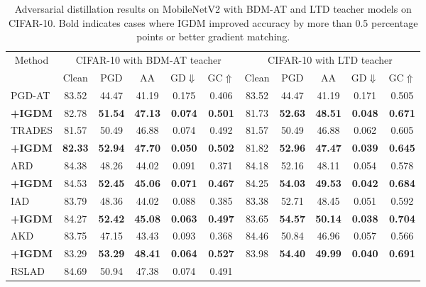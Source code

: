 \documentclass{article} %
\begin{document}
\begin{table}[h]
 \centering
 \caption{Adversarial distillation results on MobileNetV2 with BDM-AT and LTD teacher models on CIFAR-10. Bold indicates cases where IGDM improved accuracy by more than 0.5 percentage points or better gradient matching.}
 \setlength{\tabcolsep}{6pt}
 \begin{tabular}{lcccccccccc}
 \toprule
   \multicolumn{1}{c}{\multirow{2.5}{*}{Method}}& \multicolumn{5}{c}{CIFAR-10 with BDM-AT teacher}& \multicolumn{5}{c}{CIFAR-10 with LTD teacher} \\
   \cmidrule(r){2-6}
   \cmidrule(r){7-11}
   & Clean & PGD & AA & GD$\Downarrow$ & GC$\Uparrow$ & Clean & PGD & AA & GD$\Downarrow$ & GC$\Uparrow$ \\
\midrule PGD-AT  & 83.52 & 44.47 & 41.19 & 0.175 & 0.406  
& 83.52 & 44.47 & 41.19 & 0.171 & 0.505 
\\
 \textbf{+IGDM} & 82.78 & \textbf{51.54} & \textbf{47.13} & \textbf{0.074} & \textbf{0.501} 
& 81.73 & \textbf{52.63} & \textbf{48.51} & \textbf{0.048} & \textbf{0.671} 
\\
\midrule TRADES  & 81.57 & 50.49 & 46.88 & 0.074 & 0.492 
& 81.57 & 50.49 & 46.88 & 0.062 & 0.605 
\\
 \textbf{+IGDM} &\textbf{82.33} & \textbf{52.94} & \textbf{47.70} &\textbf{0.050} & \textbf{0.502} 
&81.82 & \textbf{52.96} & \textbf{47.47} & \textbf{0.039} & \textbf{0.645} 
\\
\midrule
 ARD & 84.38 & 48.26 & 44.02 & 0.091 & 0.371  
& 84.18 & 52.16 & 48.11 & 0.054 & 0.578 
\\
 \textbf{+IGDM} & 84.53 & \textbf{52.45} & \textbf{45.06} & \textbf{0.071} & \textbf{0.467}  
& 84.25 & \textbf{54.03} & \textbf{49.53} & \textbf{0.042} & \textbf{0.684} 
\\
 \midrule
 IAD & 83.79 & 48.36 & 44.02 & 0.088 & 0.385  
& 83.38 & 52.71 & 48.45 & 0.051 & 0.592 
\\
 \textbf{+IGDM} & 84.27 & \textbf{52.42} & \textbf{45.08} & \textbf{0.063} & \textbf{0.497}  
& 83.65 & \textbf{54.57} & \textbf{50.14} & \textbf{0.038} &\textbf{0.704} \\
 \midrule
 AKD & 83.75& 47.15& 43.43& 0.093& 0.368& 84.46& 50.84& 46.96& 0.057& 0.566\\
 \textbf{+IGDM} & 83.29& \textbf{53.29}& \textbf{48.41}& \textbf{0.064}& \textbf{0.527}& 83.98& \textbf{54.40}& \textbf{49.99}& \textbf{0.040}& \textbf{0.691}\\
 \midrule
 RSLAD & 84.69 & 50.94 & 47.38 & 0.074 & 0.491 

\end{tabular}
\end{table}
\end{document}
